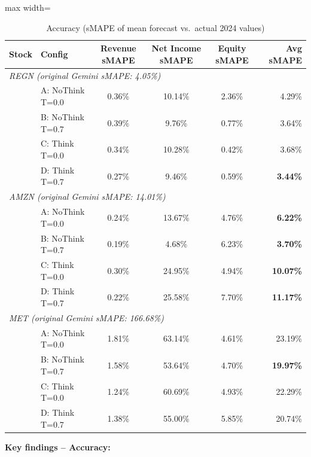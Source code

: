\documentclass[11pt,a4paper]{article}
\begin{document}
\begin{table}[H]\centering
\caption{Accuracy (sMAPE of mean forecast vs.\ actual 2024 values)}
\label{tab:think_accuracy}
\begin{adjustbox}{max width=\textwidth}
\begin{tabular}{llcccr}\toprule
\textbf{Stock} & \textbf{Config} &
\textbf{Revenue sMAPE} & \textbf{Net Income sMAPE} & \textbf{Equity sMAPE} &
\textbf{Avg sMAPE}\\\midrule
\multicolumn{6}{l}{\textit{REGN (original Gemini sMAPE: 4.05\%)}}\\
& A: NoThink T=0.0 & 0.36\% & 10.14\% & 2.36\% & 4.29\%\\
& B: NoThink T=0.7 & 0.39\% &  9.76\% & 0.77\% & 3.64\%\\
& C: Think   T=0.0 & 0.34\% & 10.28\% & 0.42\% & 3.68\%\\
\rowcolor{bestgreen}
& D: Think   T=0.7 & 0.27\% &  9.46\% & 0.59\% & \textbf{3.44\%}\\[4pt]
\multicolumn{6}{l}{\textit{AMZN (original Gemini sMAPE: 14.01\%)}}\\
\rowcolor{bestgreen}
& A: NoThink T=0.0 & 0.24\% & 13.67\% & 4.76\% & \textbf{6.22\%}\\
\rowcolor{bestgreen}
& B: NoThink T=0.7 & 0.19\% &  4.68\% & 6.23\% & \textbf{3.70\%}\\
\rowcolor{badred}
& C: Think   T=0.0 & 0.30\% & 24.95\% & 4.94\% & \textbf{10.07\%}\\
\rowcolor{badred}
& D: Think   T=0.7 & 0.22\% & 25.58\% & 7.70\% & \textbf{11.17\%}\\[4pt]
\multicolumn{6}{l}{\textit{MET (original Gemini sMAPE: 166.68\%)}}\\
& A: NoThink T=0.0 & 1.81\% & 63.14\% & 4.61\% & 23.19\%\\
\rowcolor{bestgreen}
& B: NoThink T=0.7 & 1.58\% & 53.64\% & 4.70\% & \textbf{19.97\%}\\
& C: Think   T=0.0 & 1.24\% & 60.69\% & 4.93\% & 22.29\%\\
& D: Think   T=0.7 & 1.38\% & 55.00\% & 5.85\% & 20.74\%\\
\bottomrule
\end{tabular}
\end{adjustbox}
\end{table}

\textbf{Key findings -- Accuracy:}
\end{document}
